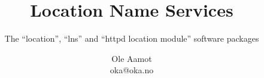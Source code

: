 \documentclass{article}
\begin{document}
\title{Location Name Services}
\subtitle{The ``location'', ``lns'' and ``httpd location module'' software packages}
\author{Ole Aamot\\ oka@oka.no}
\maketitle
\end{document}
